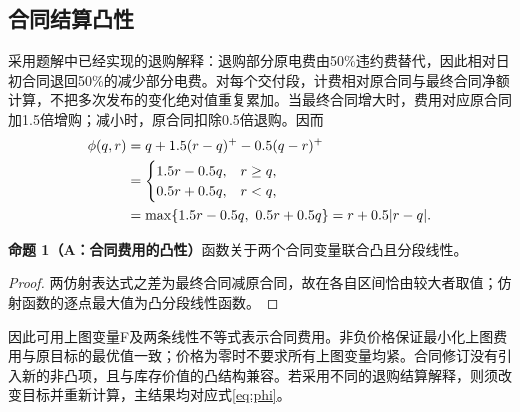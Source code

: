 \documentclass[UTF8,a4paper,zihao=-4,fontset=mac]{ctexart}
\newcommand{\pp}[2]{\par\noindent\textbf{命题 #1（#2）}\quad}
\begin{document}
\subsection{合同结算凸性}
采用题解中已经实现的退购解释：退购部分原电费由50\%违约费替代，因此相对日初合同退回50\%的减少部分电费。对每个交付段，计费相对原合同与最终合同净额计算，不把多次发布的变化绝对值重复累加。当最终合同增大时，费用对应原合同加1.5倍增购；减小时，原合同扣除0.5倍退购。因而
\begin{align}
 \phi(q,r)&=q+1.5(r-q)^+-0.5(q-r)^+\notag\\
 &=\begin{cases}1.5r-0.5q,&r\ge q,\\0.5r+0.5q,&r<q,\end{cases}\label{eq:phi}\\
 &=\max\{1.5r-0.5q,\ 0.5r+0.5q\}=r+0.5|r-q|.\notag
\end{align}
\pp{1}{A：合同费用的凸性}函数关于两个合同变量联合凸且分段线性。
\begin{proof}
两仿射表达式之差为最终合同减原合同，故在各自区间恰由较大者取值；仿射函数的逐点最大值为凸分段线性函数。
\end{proof}
因此可用上图变量F及两条线性不等式表示合同费用。非负价格保证最小化上图费用与原目标的最优值一致；价格为零时不要求所有上图变量均紧。合同修订没有引入新的非凸项，且与库存价值的凸结构兼容。若采用不同的退购结算解释，则须改变目标并重新计算，主结果均对应式\eqref{eq:phi}。
\end{document}
